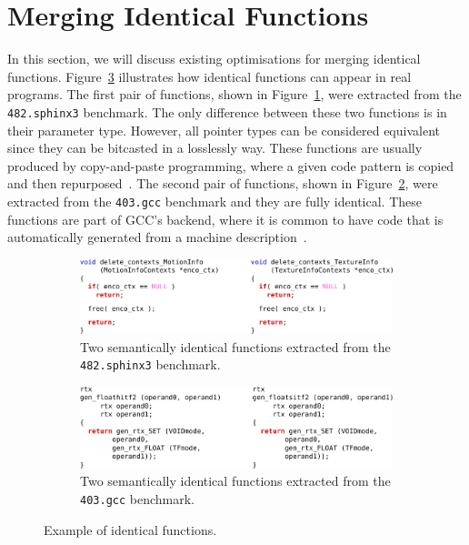 
\section{Merging Identical Functions}

In this section, we will discuss existing optimisations for merging identical functions.
Figure~\ref{fig:example-identical} illustrates how identical functions can appear in real programs.
The first pair of functions, shown in Figure~\ref{fig:example-identical-1-sphinx3}, were extracted from the \texttt{482.sphinx3} benchmark.
The only difference between these two functions is in their parameter type.
However, all pointer types can be considered equivalent since they can be bitcasted in a losslessly way.
These functions are usually produced by copy-and-paste programming, where a given code pattern is copied and then repurposed~\cite{kim04,jablonski10,ahmed15}.
The second pair of functions, shown in Figure~\ref{fig:example-identical-2-gcc}, were extracted from the \texttt{403.gcc} benchmark and they are fully identical.
These functions are part of GCC's backend, where it is common to have code that is automatically generated from a machine description~\cite{muchnick98,kolek13,ghica15}.

\begin{figure}[h]
\centering
\begin{subfigure}{\textwidth}
\centering
\includegraphics[scale=0.9]{src/relatedwork/figs/example-identical-1-sphinx3}
\caption{Two semantically identical functions extracted from the \texttt{482.sphinx3} benchmark.}
\label{fig:example-identical-1-sphinx3}
\end{subfigure}
\begin{subfigure}{\textwidth}
\centering
\includegraphics[scale=0.9]{src/relatedwork/figs/example-identical-2-gcc}
\caption{Two semantically identical functions extracted from the \texttt{403.gcc} benchmark.}
\label{fig:example-identical-2-gcc}
\end{subfigure}
\caption{Example of identical functions.}
\label{fig:example-identical}
\end{figure}

